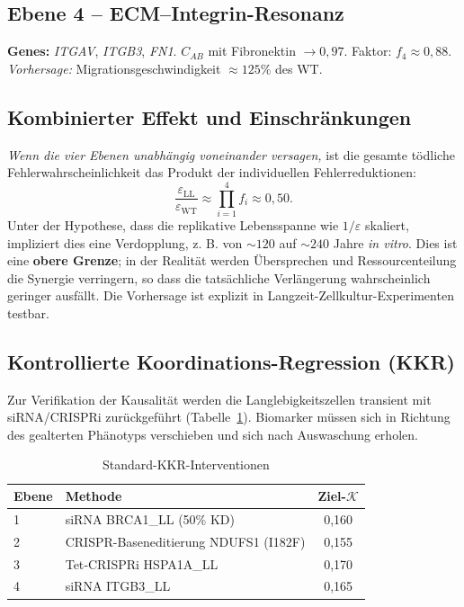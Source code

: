 \documentclass[12pt,a4paper]{article}
\newcommand{\REL}{\mathcal{K}}          %
\begin{document}
	\subsection{Ebene 4 – ECM–Integrin-Resonanz}
	\textbf{Genes:} \emph{ITGAV}, \emph{ITGB3}, \emph{FN1}. \(C_{AB}\) mit Fibronektin \(\to 0,97\).  
	Faktor: \(f_4 \approx 0,88\).  
	\textit{Vorhersage:} Migrationsgeschwindigkeit \(\approx 125\%\) des WT.
	
	\subsection{Kombinierter Effekt und Einschränkungen}
	\textit{Wenn die vier Ebenen unabhängig voneinander versagen,} ist die gesamte tödliche Fehlerwahrscheinlichkeit das Produkt der individuellen Fehlerreduktionen:
	\[
	\frac{\varepsilon_{\mathrm{LL}}}{\varepsilon_{\mathrm{WT}}} \approx \prod_{i=1}^{4} f_i \approx 0,50.
	\]
	Unter der Hypothese, dass die replikative Lebensspanne wie \(1/\varepsilon\) skaliert, impliziert dies eine Verdopplung, z. B. von \(\sim 120\) auf \(\sim 240\) Jahre \textit{in vitro}. Dies ist eine \textbf{obere Grenze}; in der Realität werden Übersprechen und Ressourcenteilung die Synergie verringern, so dass die tatsächliche Verlängerung wahrscheinlich geringer ausfällt. Die Vorhersage ist explizit in Langzeit-Zellkultur-Experimenten testbar.
	
	\subsection{Kontrollierte Koordinations-Regression (KKR)}
	Zur Verifikation der Kausalität werden die Langlebigkeitszellen transient mit siRNA/CRISPRi zurückgeführt (Tabelle~\ref{tab:CCR}). Biomarker müssen sich in Richtung des gealterten Phänotyps verschieben und sich nach Auswaschung erholen.
	
	\begin{table}[H]
		\centering
		\caption{Standard-KKR-Interventionen}
		\label{tab:CCR}
		\begin{tabular}{@{}llc@{}}
			\toprule
			\textbf{Ebene} & \textbf{Methode} & \textbf{Ziel-\(\REL\)} \\
			\midrule
			1 & siRNA BRCA1\_LL (50\% KD) & 0,160 \\
			2 & CRISPR-Baseneditierung NDUFS1 (I182F) & 0,155 \\
			3 & Tet‑CRISPRi HSPA1A\_LL & 0,170 \\
			4 & siRNA ITGB3\_LL & 0,165 \\
			\bottomrule
		\end{tabular}
	\end{table}
	
\end{document}
